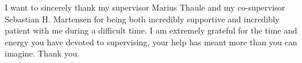 I want to sincerely thank my supervisor Marius Thaule and my co-supervisor Sebastian H. Martensen for being both incredibly supportive and incredibly patient with me during a difficult time. I am extremely grateful for the time and energy you have devoted to supervising, your help has meant more than you can imagine. Thank you.